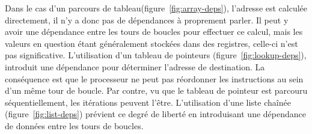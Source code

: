 Dans le cas d'un parcours de tableau(figure~\ref{fig:array-deps}), l'adresse est calculée directement, il n'y a donc pas de dépendances à proprement parler.
Il peut y avoir une dépendance entre les tours de boucles pour effectuer ce calcul, mais les valeurs en question étant généralement stockées dans des registres, celle-ci n'est pas significative.
L'utilisation d'un tableau de pointeurs (figure~\ref{fig:lookup-deps}), introduit une dépendance pour déterminer l'adresse de destination.
La conséquence est que le processeur ne peut pas réordonner les instructions au sein d'un même tour de boucle.
Par contre, vu que le tableau de pointeur est parcouru séquentiellement, les itérations peuvent l'être.
L'utilisation d'une liste chaînée (figure~\ref{fig:list-deps}) prévient ce degré de liberté en introduisant une dépendance de données entre les tours de boucles.

